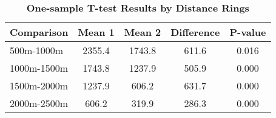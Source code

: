 \begin{table}[htbp]
\centering
\begin{tabular}{l|c c c c}
\hline
Comparison & Mean 1 & Mean 2 & Difference & P-value \\
\hline
500m-1000m & 2355.4 & 1743.8 & 611.6 & 0.016 \\
1000m-1500m & 1743.8 & 1237.9 & 505.9 & 0.000 \\
1500m-2000m & 1237.9 & 606.2 & 631.7 & 0.000 \\
2000m-2500m & 606.2 & 319.9 & 286.3 & 0.000 \\
\hline
\end{tabular}
\caption{\textbf{One-sample T-test Results by Distance Rings}}
\label{tab:ttests}
\end{table}
